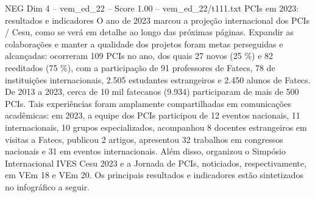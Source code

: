 \begin{textsample}{NEG Dim 4 – vem\_ed\_22 – Score 1.00 – vem\_ed\_22/t111.txt}  \label{ex:f4_neg_014}
PCIs em 2023: resultados e indicadores O ano de 2023 marcou a projeção internacional dos PCIs / Cesu, como se verá em detalhe ao longo das próximas páginas.
Expandir as colaborações e manter a qualidade dos projetos foram metas perseguidas e alcançadas: ocorreram 109 PCIs no ano, dos quais 27 novos (25 \%) e 82 reeditados (75 \%), com a participação de 91 professores de Fatecs, 78 de instituições internacionais, 2.505 estudantes estrangeiros e 2.450 alunos de Fatecs.
De 2013 a 2023, cerca de 10 mil fatecanos (9.934) participaram de mais de 500 PCIs.
Tais experiências foram amplamente compartilhadas em comunicações acadêmicas: em 2023, a equipe dos PCIs participou de 12 eventos nacionais, 11 internacionais, 10 grupos especializados, acompanhou 8 docentes estrangeiros em visitas a Fatecs, publicou 2 artigos, apresentou 32 trabalhos em congressos nacionais e 31 em eventos internacionais.
Além disso, organizou o Simpósio Internacional IVES Cesu 2023 e a Jornada de PCIs, noticiados, respectivamente, em VEm 18 e VEm 20.
Os principais resultados e indicadores estão sintetizados no infográfico a seguir.

\end{textsample}
